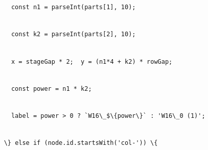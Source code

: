 \documentclass[
]{article}
\newcommand{\passthrough}[1]{#1}
\begin{document}
\passthrough{\lstinline!      !}\passthrough{\lstinline!const!}\passthrough{\lstinline! !}\passthrough{\lstinline!n1!}\passthrough{\lstinline! !}\passthrough{\lstinline!=!}\passthrough{\lstinline! !}\passthrough{\lstinline!parseInt!}\passthrough{\lstinline!(parts[1],!}\passthrough{\lstinline! !}\passthrough{\lstinline!10);!}\strut \\
\passthrough{\lstinline!      !}\passthrough{\lstinline!const!}\passthrough{\lstinline! !}\passthrough{\lstinline!k2!}\passthrough{\lstinline! !}\passthrough{\lstinline!=!}\passthrough{\lstinline! !}\passthrough{\lstinline!parseInt!}\passthrough{\lstinline!(parts[2],!}\passthrough{\lstinline! !}\passthrough{\lstinline!10);!}\strut \\
\passthrough{\lstinline!      !}\passthrough{\lstinline!x!}\passthrough{\lstinline! !}\passthrough{\lstinline!=!}\passthrough{\lstinline! !}\passthrough{\lstinline!stageGap!}\passthrough{\lstinline! !}\passthrough{\lstinline!*!}\passthrough{\lstinline! !}\passthrough{\lstinline!2;!}\passthrough{\lstinline!  !}\passthrough{\lstinline!y!}\passthrough{\lstinline! !}\passthrough{\lstinline!=!}\passthrough{\lstinline! !}\passthrough{\lstinline!(n1*4!}\passthrough{\lstinline! !}\passthrough{\lstinline!+!}\passthrough{\lstinline! !}\passthrough{\lstinline!k2)!}\passthrough{\lstinline! !}\passthrough{\lstinline!*!}\passthrough{\lstinline! !}\passthrough{\lstinline!rowGap!}\passthrough{\lstinline!;!}\strut \\
\passthrough{\lstinline!      !}\passthrough{\lstinline!const!}\passthrough{\lstinline! !}\passthrough{\lstinline!power!}\passthrough{\lstinline! !}\passthrough{\lstinline!=!}\passthrough{\lstinline! !}\passthrough{\lstinline!n1!}\passthrough{\lstinline! !}\passthrough{\lstinline!*!}\passthrough{\lstinline! !}\passthrough{\lstinline!k2;!}\strut \\
\passthrough{\lstinline!      !}\passthrough{\lstinline!label!}\passthrough{\lstinline! !}\passthrough{\lstinline!=!}\passthrough{\lstinline! !}\passthrough{\lstinline!power!}\passthrough{\lstinline! !}\passthrough{\lstinline!>!}\passthrough{\lstinline! !}\passthrough{\lstinline!0!}\passthrough{\lstinline! !}\passthrough{\lstinline!?!}\passthrough{\lstinline! !}\passthrough{\lstinline!`W16\_$\{power\}`!}\passthrough{\lstinline! !}\passthrough{\lstinline!:!}\passthrough{\lstinline! !}\passthrough{\lstinline!'W16\_0!}\passthrough{\lstinline! !}\passthrough{\lstinline!(1)';!}\strut \\
\passthrough{\lstinline!    !}\passthrough{\lstinline!\}!}\passthrough{\lstinline! !}\passthrough{\lstinline!else!}\passthrough{\lstinline! !}\passthrough{\lstinline!if!}\passthrough{\lstinline! !}\passthrough{\lstinline!(!}\passthrough{\lstinline!node.id.startsWith!}\passthrough{\lstinline!('col-'))!}\passthrough{\lstinline! !}\passthrough{\lstinline!\{!}\strut \\
\end{document}

